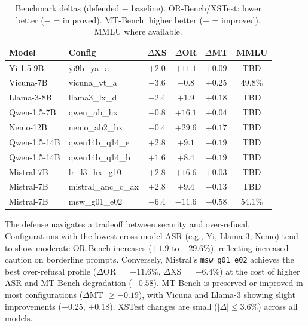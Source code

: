 \begin{table}[ht]
\centering
\caption{Benchmark deltas (defended $-$ baseline). OR-Bench/XSTest: lower better ($-$ = improved). MT-Bench: higher better ($+$ = improved). MMLU where available.}
\label{tab:benchmark_results}
\setlength{\tabcolsep}{4pt}
\begin{tabular}{@{}llcccc@{}}
\toprule
\textbf{Model} & \textbf{Config} & \textbf{$\Delta$XS} & \textbf{$\Delta$OR} & \textbf{$\Delta$MT} & \textbf{MMLU} \\
\midrule
Yi-1.5-9B      & yi9b\_ya\_a        & $+2.0$  & $+11.1$ & $+0.09$ & TBD   \\
Vicuna-7B      & vicuna\_vt\_a      & $-3.6$  & $-0.8$  & $+0.25$ & 49.8\% \\
Llama-3-8B     & llama3\_lx\_d      & $-2.4$  & $+1.9$  & $+0.18$ & TBD   \\
Qwen-1.5-7B    & qwen\_ab\_hx       & $-0.8$  & $+16.1$ & $+0.04$ & TBD   \\
Nemo-12B       & nemo\_ab2\_hx      & $-0.4$  & $+29.6$ & $+0.17$ & TBD   \\
Qwen-1.5-14B   & qwen14b\_q14\_e    & $+2.8$  & $+9.1$  & $-0.19$ & TBD   \\
Qwen-1.5-14B   & qwen14b\_q14\_b    & $+1.6$  & $+8.4$  & $-0.19$ & TBD   \\
Mistral-7B     & lr\_l3\_hx\_g10    & $+2.8$  & $+16.6$ & $+0.03$ & TBD   \\
Mistral-7B     & mistral\_anc\_q\_ax & $+2.8$ & $+9.4$  & $-0.13$ & TBD   \\
Mistral-7B     & msw\_g01\_e02      & $-6.4$  & $-11.6$ & $-0.58$ & 54.1\% \\
\bottomrule
\end{tabular}
\setlength{\tabcolsep}{6pt}
\end{table}

The defense navigates a tradeoff between security and over-refusal. Configurations with the lowest cross-model ASR (e.g., Yi, Llama-3, Nemo) tend to show moderate OR-Bench increases ($+1.9$ to $+29.6$\%), reflecting increased caution on borderline prompts. Conversely, Mistral's \texttt{msw\_g01\_e02} achieves the best over-refusal profile ($\Delta$OR $= -11.6\%$, $\Delta$XS $= -6.4\%$) at the cost of higher ASR and MT-Bench degradation ($-0.58$). MT-Bench is preserved or improved in most configurations ($\Delta$MT $\geq -0.19$), with Vicuna and Llama-3 showing slight improvements ($+0.25$, $+0.18$). XSTest changes are small ($|\Delta| \leq 3.6\%$) across all models.

